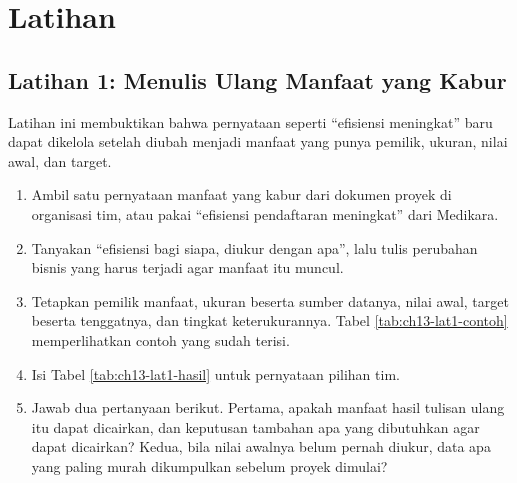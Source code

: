 \section{Latihan}

\subsection*{Latihan 1: Menulis Ulang Manfaat yang Kabur}

Latihan ini membuktikan bahwa pernyataan seperti ``efisiensi meningkat''
baru dapat dikelola setelah diubah menjadi manfaat yang punya pemilik,
ukuran, nilai awal, dan target.

\begin{enumerate}
  \item Ambil satu pernyataan manfaat yang kabur dari dokumen proyek di
        organisasi tim, atau pakai ``efisiensi pendaftaran meningkat'' dari
        Medikara.
  \item Tanyakan ``efisiensi bagi siapa, diukur dengan apa'', lalu tulis
        perubahan bisnis yang harus terjadi agar manfaat itu muncul.
  \item Tetapkan pemilik manfaat, ukuran beserta sumber datanya, nilai awal,
        target beserta tenggatnya, dan tingkat keterukurannya. Tabel
        \ref{tab:ch13-lat1-contoh} memperlihatkan contoh yang sudah terisi.
  \item Isi Tabel \ref{tab:ch13-lat1-hasil} untuk pernyataan pilihan tim.
  \item Jawab dua pertanyaan berikut. Pertama, apakah manfaat hasil tulisan
        ulang itu dapat dicairkan, dan keputusan tambahan apa yang
        dibutuhkan agar dapat dicairkan? Kedua, bila nilai awalnya belum
        pernah diukur, data apa yang paling murah dikumpulkan sebelum proyek
        dimulai?
\end{enumerate}

